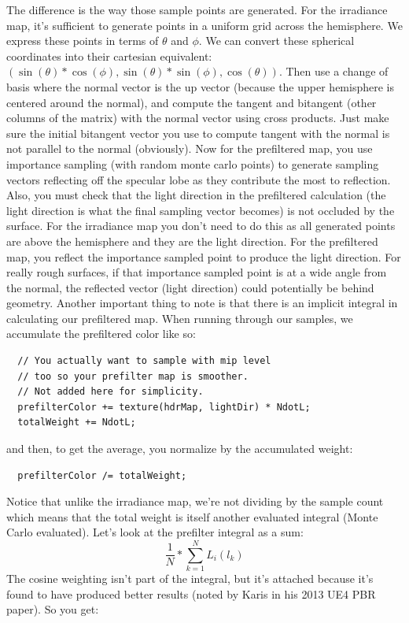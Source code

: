 \documentclass{article}
\begin{document}
The difference is the way those sample points are generated. For the irradiance map, it's sufficient to generate points in a uniform grid across
the hemisphere. We express these points in terms of \(\theta\) and \(\phi\). We can convert these spherical coordinates into their cartesian equivalent:
\((\sin(\theta)*\cos(\phi), \sin(\theta)*\sin(\phi), \cos(\theta))\). Then use a change of basis where the normal vector is the up vector (because the upper hemisphere 
is centered around the normal), and compute the tangent and bitangent (other columns of the matrix) with the normal vector using cross products. Just make sure the initial bitangent
vector you use to compute tangent with the normal is not parallel to the normal (obviously). Now for the prefiltered map, you use importance sampling (with random monte carlo points)
to generate sampling vectors reflecting off the specular lobe as they contribute the most to reflection. Also, you must check that the light direction in the prefiltered calculation 
(the light direction is what the final sampling vector becomes) is not occluded by the surface. For the irradiance map you don't need to do this as all generated points are above the hemisphere
and they are the light direction. For the prefiltered map, you reflect the importance sampled point to produce the light direction. For really rough surfaces, if that importance sampled point 
is at a wide angle from the normal, the reflected vector (light direction) could potentially be behind geometry. Another important thing to note is that there is an implicit integral in calculating our prefiltered map. When running through our samples, we accumulate the prefiltered color like so:
\begin{verbatim}
  // You actually want to sample with mip level
  // too so your prefilter map is smoother. 
  // Not added here for simplicity.
  prefilterColor += texture(hdrMap, lightDir) * NdotL;
  totalWeight += NdotL;
\end{verbatim}
and then, to get the average, you normalize by the accumulated weight: 
\begin{verbatim}
  prefilterColor /= totalWeight;
\end{verbatim}
Notice that unlike the irradiance map, we're not dividing by the sample count which means that the total weight is itself another evaluated integral (Monte Carlo evaluated). Let's look at the prefilter integral as a sum:
\[\frac{1}{N} * \sum_{k=1}^{N} L_i(l_k)\]
The cosine weighting isn't part of the integral, but it's attached because it's found to have produced better results (noted by Karis in his 2013 UE4 PBR paper). So you get:
\end{document}
